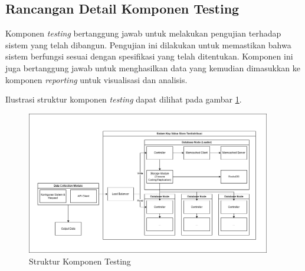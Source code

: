 \subsection{Rancangan Detail Komponen Testing}
\label{subsection:detail-data-testing}

Komponen \textit{testing} bertanggung jawab untuk melakukan pengujian terhadap sistem yang telah dibangun. Pengujian ini dilakukan untuk memastikan bahwa sistem berfungsi sesuai dengan spesifikasi yang telah ditentukan. Komponen ini juga bertanggung jawab untuk menghasilkan data yang kemudian dimasukkan ke komponen \textit{reporting} untuk visualisasi dan analisis.

Ilustrasi struktur komponen \textit{testing} dapat dilihat pada gambar \ref{fig:testing-structure}.

\begin{figure}[ht]
    \centering
    \includegraphics[width=0.95\textwidth]{resources/chapter-3/general-architecture.png}
    \caption{Struktur Komponen Testing}
    \label{fig:testing-structure}
\end{figure}